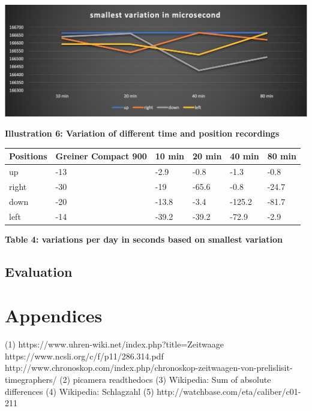 \documentclass[12pt, a4paper]{report}
\begin{document}
\bigskip

\begin{center}
\includegraphics[scale=0.3]{Images/smallest_variation.png}

{\bf Illustration 6: Variation of different time and position recordings}
\end{center}
\begin{table}[H]
    \begin{tabular}{|l|l|l|l|l|l|}
    \hline
    Positions & Greiner Compact 900 & 10 min & 20 min & 40 min & 80 min \\ \hline
    up        & -13                 & -2.9     & -0.8     & -1.3      & -0.8      \\ \hline
    right     & -30                 & -19      & -65.6    & -0.8      & -24.7      \\ \hline
    down      & -20                 & -13.8    & -3.4     & -125.2    & -81.7      \\ \hline
    left      & -14                 & -39.2	   & -39.2	  & -72.9	  & -2.9      \\ \hline
    \end{tabular}
\end{table}
\begin{center}    
{\bf Table 4: variations per day in seconds based on smallest variation} 
\end{center}

\section{Evaluation}


\pagebreak

\chapter{Appendices}

\begin{thebibliography}{9}
\bigskip
{} 
(1) https://www.uhren-wiki.net/index.php?title=Zeitwaage
 https://www.ncsli.org/c/f/p11/286.314.pdf
 http://www.chronoskop.com/index.php/chronoskop-zeitwaagen-von-prelislisit-timegraphers/
\bibitem[Picamera]
(2) picamera readthedocs
\bibitem[SAD]
(3) Wikipedia: Sum of absolute differences
\bibitem[Schlagzahl]
(4) Wikipedia: Schlagzahl
(5) http://watchbase.com/eta/caliber/c01-211
\end{thebibliography}
\end{document}
